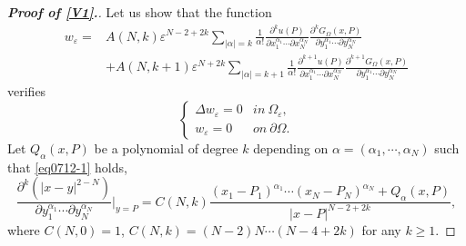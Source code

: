 \documentclass[11pt,reqno]{article}
\numberwithin{equation}{section}
\newcommand\e\varepsilon
\renewcommand\O\Omega
\newcommand{\Ma}{\color{blue}}
\newcommand{\Ying}{\color{red}}
\begin{document}
		\begin{proof}[\bf Proof of \eqref{V1}.]
			Let us show that the function 
            \begin{equation}\label{eqwe}
				\begin{aligned}
					w_\e=&A(N,k)\e^{N-2+2k}	\sum_{|\alpha|=k}\frac1{\alpha!}
					\frac{\partial^ku(P)}{\partial x_1^{\alpha_1}\cdots\partial x_N^{\alpha_N}}
					\frac{\partial^kG_{\Omega}(x,P)}{\partial y_1^{\alpha_1}\cdots\partial y_N^{\alpha_N}}\\
					&+A(N,k+1)\e^{N+2k}	\sum_{|\alpha|=k+1}\frac1{\alpha!}
					\frac{\partial^{k+1}u(P)}{\partial x_1^{\alpha_1}\cdots\partial x_N^{\alpha_N}}
					\frac{\partial^{k+1}G_{\Omega}(x,P)}{\partial y_1^{\alpha_1}\cdots\partial y_N^{\alpha_N}}
				\end{aligned}      
            \end{equation}
			verifies
			\begin{equation}
				\begin{cases}
					\Delta w_\e=0&in\ \O_\e,\\
					w_\e=0&on\ \partial\O.
				\end{cases}
			\end{equation}
			  Let $Q_\alpha(x,P)$ be a polynomial of degree $k$ depending on $\alpha=(\alpha_1,\cdots,\alpha_N)$ such that \eqref{eq0712-1} holds,
				\begin{equation}\label{eq0712-1}
					\frac{\partial^k\left(|x-y|^{2-N}\right)}{\partial y_1^{\alpha_1}\cdots\partial y_N^{\alpha_N}}\Bigg|_{y=P}=C(N,k)\frac{(x_1-P_1)^{\alpha_1}\cdots(x_N-P_N)^{\alpha_N}+Q_\alpha(x,P)}
					{|x-P|^{N-2+2k}},
				\end{equation}
			where  $C(N,0)=1$, $C(N,k)=(N-2)N\cdots(N-4+2k)$ for any $k\ge 1$. 

\end{proof}
\end{document}
